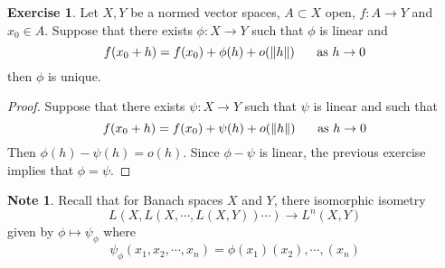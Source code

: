 \documentclass[12pt]{amsart}
\theoremstyle{definition}
\newtheorem{note}[definition]{Note}
\newtheorem{ex}[definition]{Exercise}
\newcommand{\lex}[1]{\label{ex:#1}}
\begin{document}
	\begin{ex} \lex{62002}
	Let $X, Y$ be a normed vector spaces, $A \subset X$ open, $f:A \rightarrow Y$ and $x_0 \in A$. Suppose that there exists $\phi: X \rightarrow Y$ such that $\phi$ is linear and $$f(x_0 + h) = f(x_0) + \phi(h) + o(\|h\| ) \hspace{.5cm} \text{ as } h \rightarrow 0$$ then $\phi$ is unique. 
	\end{ex}
	
	\begin{proof}
	Suppose that there exists $\psi : X \rightarrow Y$ such that $\psi$ is linear and such that
	$$f(x_0 + h) = f(x_0) + \psi(h) + o(\|h\| ) \hspace{.5cm} \text{ as } h \rightarrow 0$$ 
	Then $\phi(h) - \psi(h) = o(h)$. Since $\phi - \psi$ is linear, the previous exercise implies that $\phi = \psi$.
	\end{proof}
	
	\begin{note}
	Recall that for Banach spaces $X$ and $Y$, there isomorphic isometry $$L(X, L(X, \cdots, L(X, Y)) \cdots) \rightarrow L^n(X, Y)$$ given by $\phi \mapsto \psi_{\phi}$ where $$\psi_{\phi}(x_1, x_2, \cdots, x_n) = \phi(x_1)(x_2),\cdots,(x_n)$$
	\end{note}	
	
\end{document}
